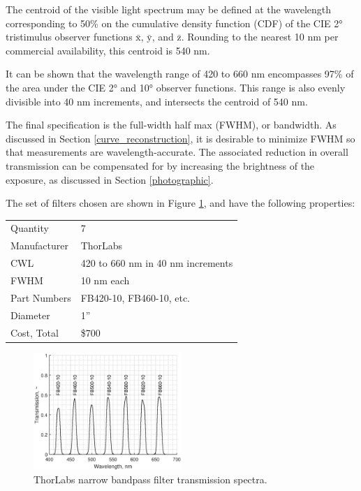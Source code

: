 \documentclass[twocolumn,10pt]{asme2ej}
\newcommand{\id}{\hspace{6 mm}}
\begin{document}
\id The centroid of the visible light spectrum may be defined at the wavelength corresponding to 50\% on the cumulative density function (CDF) of the CIE 2° tristimulus observer functions $\mathrm{\bar{x}}$, $\mathrm{\bar{y}}$, and $\mathrm{\bar{z}}$. Rounding to the nearest 10 nm per commercial availability, this centroid is 540 nm.

\id It can be shown that the wavelength range of 420 to 660 nm encompasses 97\% of the area under the CIE 2° and 10° observer functions. This range is also evenly divisible into 40 nm increments, and intersects the centroid of 540 nm.

\id The final specification is the full-width half max (FWHM), or bandwidth. As discussed in Section \ref{curve_reconstruction}, it is desirable to minimize FWHM so that measurements are wavelength-accurate. The associated reduction in overall transmission can be compensated for by increasing the brightness of the exposure, as discussed in Section \ref{photographic}.

\id The set of filters chosen are shown in Figure \ref{thorlabs_filter_transmission_spectra}, and have the following properties:\\

\begin{tabular}{l | l}
Quantity & 7 \\
Manufacturer & ThorLabs \\
CWL & 420 to 660 nm in 40 nm increments \\
FWHM & 10 nm each \\
Part Numbers & FB420-10, FB460-10, etc. \\
Diameter & 1'' \\
Cost, Total & \$700 \\
\end{tabular}

\begin{figure}
\centering
\includegraphics[width=0.5\textwidth]{thorlabs_filter_transmission_spectra.eps}
\caption{ThorLabs narrow bandpass filter transmission spectra.}
\label{thorlabs_filter_transmission_spectra}
\end{figure}
\end{document}
